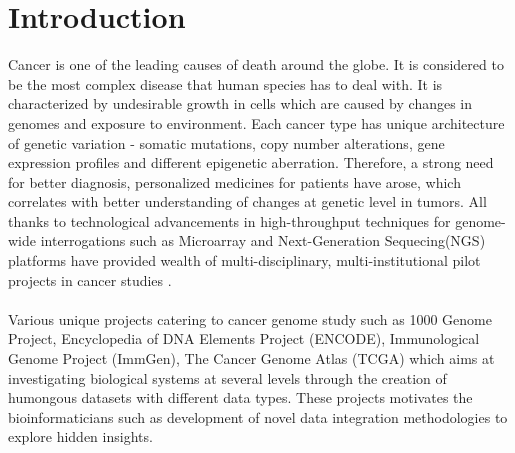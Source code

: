 %

\chapter{Introduction}
Cancer is one of the leading causes of death around the globe. It is considered to be the most complex disease that human species has to deal with. It is characterized by undesirable growth in cells which are caused by changes in genomes and exposure to environment\cite{5}. Each cancer type has unique architecture of genetic variation - somatic mutations, copy number alterations, gene expression profiles and different epigenetic aberration. Therefore, a strong need for better diagnosis, personalized medicines for patients have arose, which correlates with better understanding of changes at genetic level in tumors. All thanks to technological advancements in high-throughput techniques for genome-wide interrogations such as Microarray and Next-Generation Sequecing(NGS) platforms have provided wealth of multi-disciplinary, multi-institutional pilot projects in cancer studies\cite{stratton2009cancer} \cite{lengauer1998genetic}.\\~\\
Various unique projects catering to cancer genome study such as 1000 Genome Project\cite{10002010map}\cite{10002012integrated}, Encyclopedia of DNA Elements Project (ENCODE)\cite{ecker2012genomics}, Immunological Genome Project (ImmGen)\cite{shay2013immunological}, The Cancer Genome Atlas (TCGA)\cite{lee2016exploring} which aims at investigating biological systems at several levels through the creation of humongous datasets with different data types. These projects motivates the bioinformaticians such as development of novel data integration methodologies to explore hidden insights.\\~\\ 

